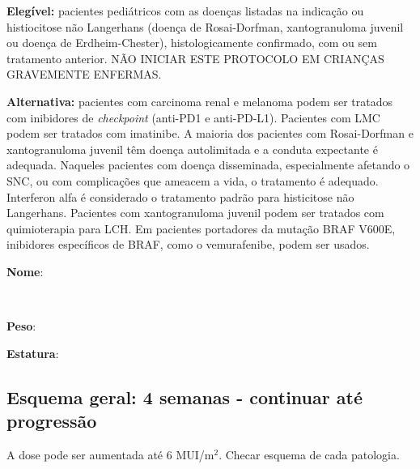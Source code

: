 \documentclass[11pt,a4paper,oldfontcommands]{memoir}
\def\entrywithlabel[#1]#2{\parbox{#1}{{\small #2:} \hrulefill}}
\begin{document}
\textbf{Elegível:} pacientes pediátricos com as doenças listadas na indicação ou histiocitose não Langerhans (doença de Rosai-Dorfman, xantogranuloma juvenil ou doença de Erdheim-Chester), histologicamente confirmado, com ou sem tratamento anterior. NÃO INICIAR ESTE PROTOCOLO EM CRIANÇAS GRAVEMENTE ENFERMAS.

\textbf{Alternativa:} pacientes com carcinoma renal e melanoma podem ser tratados com inibidores de \textit{checkpoint} (anti-PD1 e anti-PD-L1). Pacientes com LMC podem ser tratados  com imatinibe. A maioria dos pacientes com Rosai-Dorfman e xantogranuloma juvenil têm doença autolimitada e a conduta expectante é adequada. Naqueles pacientes com doença disseminada, especialmente afetando o SNC, ou com complicações que ameacem a vida, o tratamento é adequado. Interferon alfa é considerado o tratamento padrão para histicitose não Langerhans. Pacientes com xantogranuloma juvenil podem ser tratados com quimioterapia para LCH. Em pacientes portadores da mutação BRAF V600E, inibidores específicos de BRAF, como o vemurafenibe, podem ser usados.
\\[0.4cm]
\entrywithlabel[1\hsize]{\textbf{Nome}}\hfill
\\[0.3cm]
\entrywithlabel[.45\hsize]{\textbf{Peso}}\hfill  \entrywithlabel[.45\hsize]{\textbf{Estatura}}

\subsection{Esquema geral: 4 semanas - continuar até progressão}

A dose pode ser aumentada até 6 MUI/m\(^2\). Checar esquema de cada patologia.
\end{document}

